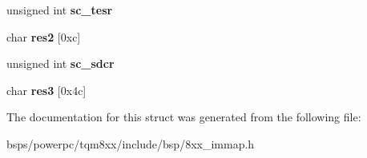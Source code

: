 \begin{DoxyCompactItemize}
unsigned int {\bfseries sc\+\_\+tesr}
\item 
\mbox{\label{structsys__conf_ab81eb3b7dd8de42cf7325c4b3c8d3461}} 
char {\bfseries res2} \mbox{[}0xc\mbox{]}
\item 
\mbox{\label{structsys__conf_a4bf2fd063d9e0843c80a9a44d2389831}} 
unsigned int {\bfseries sc\+\_\+sdcr}
\item 
\mbox{\label{structsys__conf_a1a77b36059ab037d1a36795aed74b5f2}} 
char {\bfseries res3} \mbox{[}0x4c\mbox{]}
\end{DoxyCompactItemize}


The documentation for this struct was generated from the following file\+:\begin{DoxyCompactItemize}
\item 
bsps/powerpc/tqm8xx/include/bsp/8xx\+\_\+immap.\+h\end{DoxyCompactItemize}
